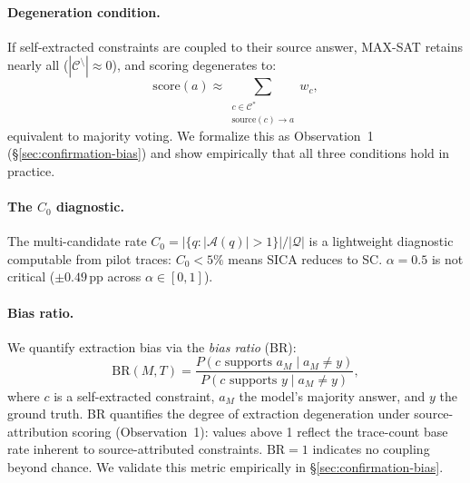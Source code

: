 \paragraph{Degeneration condition.} If self-extracted constraints are coupled to their source answer, MAX-SAT retains nearly all ($|\mathcal{C}^{\setminus}| \approx 0$), and scoring degenerates to:
\begin{equation}
\label{eq:degenerate}
\text{score}(a) \approx \sum_{\substack{c \in \mathcal{C}^* \\ \text{source}(c) \to a}} w_c,
\end{equation}
equivalent to majority voting. We formalize this as Observation~1 (\S\ref{sec:confirmation-bias}) and show empirically that all three conditions hold in practice.

\paragraph{The $C_0$ diagnostic.} The multi-candidate rate $C_0 = |\{q : |\mathcal{A}(q)| > 1\}| / |\mathcal{Q}|$ is a lightweight diagnostic computable from pilot traces: $C_0 < 5\%$ means SICA reduces to SC. $\alpha = 0.5$ is not critical (${\pm}0.49$\,pp across $\alpha \in [0, 1]$).

\paragraph{Bias ratio.} We quantify extraction bias via the \emph{bias ratio} (BR):
\begin{equation}\label{eq:mirage}
\text{BR}(M,T) = \frac{P(c \text{ supports } a_M \mid a_M \neq y)}{P(c \text{ supports } y \mid a_M \neq y)},
\end{equation}
where $c$ is a self-extracted constraint, $a_M$ the model's majority answer, and $y$ the ground truth. BR quantifies the degree of extraction degeneration under source-attribution scoring (Observation~1): values above 1 reflect the trace-count base rate inherent to source-attributed constraints. $\text{BR} = 1$ indicates no coupling beyond chance. We validate this metric empirically in \S\ref{sec:confirmation-bias}.
